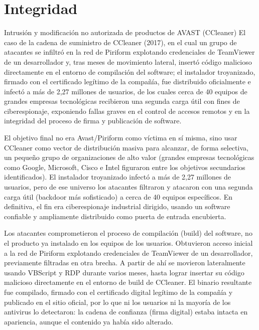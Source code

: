 \section{Integridad}

\begin{caso}{Intrusión y modificación no autorizada de productos de AVAST (CCleaner)}
  El caso de la cadena de suministro de CCleaner (2017), en el cual un grupo de atacantes se infiltró en la red de Piriform explotando credenciales de TeamViewer de un desarrollador y, tras meses de movimiento lateral, insertó código malicioso directamente en el entorno de compilación del software; el instalador troyanizado, firmado con el certificado legítimo de la compañía, fue distribuido oficialmente e infectó a más de 2,27 millones de usuarios, de los cuales cerca de 40 equipos de grandes empresas tecnológicas recibieron una segunda carga útil con fines de ciberespionaje, exponiendo fallas graves en el control de accesos remotos y en la integridad del proceso de firma y publicación de software.
\end{caso}

\begin{respuesta}
 El objetivo final no era Avast/Piriform como víctima en sí misma, sino usar
  CCleaner como vector de distribución masiva para alcanzar, de forma selectiva,
  un pequeño grupo de organizaciones de alto valor (grandes empresas tecnológicas
  como Google, Microsoft, Cisco e Intel figuraron entre los objetivos secundarios
  identificados). El instalador troyanizado infectó a más de 2,27 millones de
  usuarios, pero de ese universo los atacantes filtraron y atacaron con una segunda
  carga útil (backdoor más sofisticado) a cerca de 40 equipos específicos. En
  definitiva, el fin era ciberespionaje industrial dirigido, usando un software
  confiable y ampliamente distribuido como puerta de entrada encubierta.
\end{respuesta}

\begin{respuesta}
Los atacantes comprometieron el proceso de compilación (build) del software, no
  el producto ya instalado en los equipos de los usuarios. Obtuvieron acceso inicial
  a la red de Piriform explotando credenciales de TeamViewer de un desarrollador,
  previamente filtradas en otra brecha. A partir de ahí se movieron lateralmente
  usando VBScript y RDP durante varios meses, hasta lograr insertar su código
  malicioso directamente en el entorno de build de CCleaner. El binario resultante
  fue compilado, firmado con el certificado digital legítimo de la compañía y
  publicado en el sitio oficial, por lo que ni los usuarios ni la mayoría de los
  antivirus lo detectaron: la cadena de confianza (firma digital) estaba intacta en
  apariencia, aunque el contenido ya había sido alterado.
\end{respuesta}

